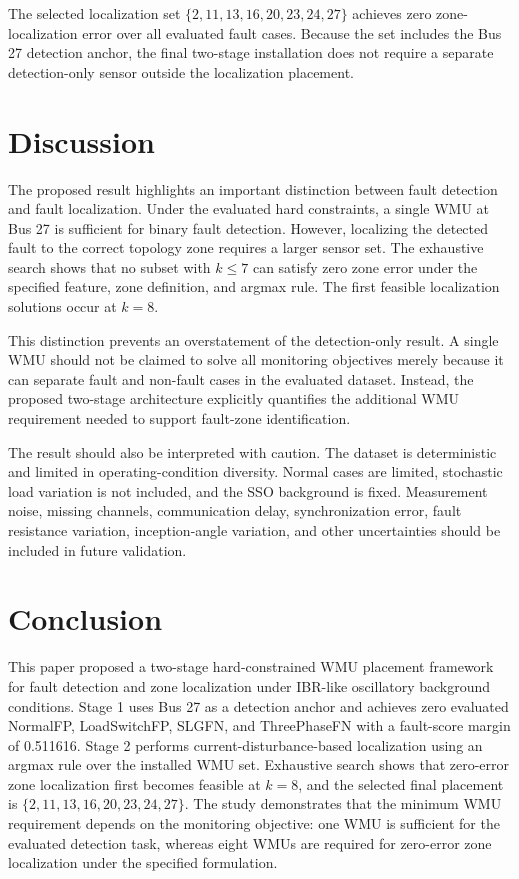 \documentclass[conference]{IEEEtran}
\begin{document}
The selected localization set $\{2,11,13,16,20,23,24,27\}$ achieves zero zone-localization error over all evaluated fault cases. Because the set includes the Bus 27 detection anchor, the final two-stage installation does not require a separate detection-only sensor outside the localization placement.

\section{Discussion}

The proposed result highlights an important distinction between fault detection and fault localization. Under the evaluated hard constraints, a single WMU at Bus 27 is sufficient for binary fault detection. However, localizing the detected fault to the correct topology zone requires a larger sensor set. The exhaustive search shows that no subset with $k\leq 7$ can satisfy zero zone error under the specified feature, zone definition, and argmax rule. The first feasible localization solutions occur at $k=8$.

This distinction prevents an overstatement of the detection-only result. A single WMU should not be claimed to solve all monitoring objectives merely because it can separate fault and non-fault cases in the evaluated dataset. Instead, the proposed two-stage architecture explicitly quantifies the additional WMU requirement needed to support fault-zone identification.

The result should also be interpreted with caution. The dataset is deterministic and limited in operating-condition diversity. Normal cases are limited, stochastic load variation is not included, and the SSO background is fixed. Measurement noise, missing channels, communication delay, synchronization error, fault resistance variation, inception-angle variation, and other uncertainties should be included in future validation.

\section{Conclusion}

This paper proposed a two-stage hard-constrained WMU placement framework for fault detection and zone localization under IBR-like oscillatory background conditions. Stage 1 uses Bus 27 as a detection anchor and achieves zero evaluated NormalFP, LoadSwitchFP, SLGFN, and ThreePhaseFN with a fault-score margin of 0.511616. Stage 2 performs current-disturbance-based localization using an argmax rule over the installed WMU set. Exhaustive search shows that zero-error zone localization first becomes feasible at $k=8$, and the selected final placement is $\{2,11,13,16,20,23,24,27\}$. The study demonstrates that the minimum WMU requirement depends on the monitoring objective: one WMU is sufficient for the evaluated detection task, whereas eight WMUs are required for zero-error zone localization under the specified formulation.
\end{document}
